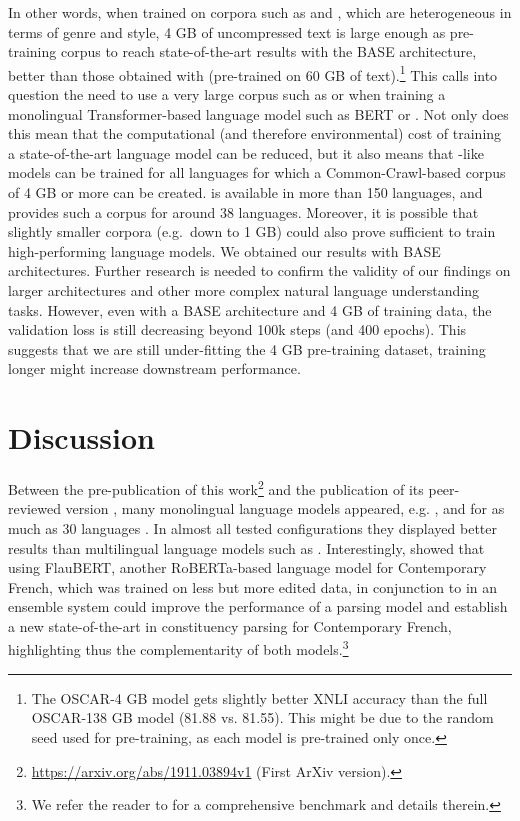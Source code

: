 In other words, when trained on corpora such as \oscar and \ccnet, which are heterogeneous in terms of genre and style, 4 GB of uncompressed text is large enough as pre-training corpus to reach state-of-the-art results with the BASE architecture, better than those obtained with \mbert (pre-trained on 60 GB of text).\footnote{The OSCAR-4 GB model gets slightly better XNLI accuracy than the full OSCAR-138 GB model (81.88 vs. 81.55). This might be due to the random seed used for pre-training, as each model is pre-trained only once.} This calls into question the need to use a very large corpus such as \oscar or \ccnet when training a monolingual Transformer-based language model such as BERT or \roberta. Not only does this mean that the computational (and therefore environmental) cost of training a state-of-the-art language model can be reduced, but it also means that \camembert-like models can be trained for all languages for which a Common-Crawl-based corpus of 4 GB or more can be created. \oscar is available in more than 150 languages, and provides such a corpus for around 38 languages. Moreover, it is possible that slightly smaller corpora (e.g.~down to 1 GB) could also prove sufficient to train high-performing language models. We obtained our results with BASE architectures. Further research is needed to confirm the validity of our findings on larger architectures and other more complex natural language understanding tasks. However, even with a BASE architecture and 4 GB of training data, the validation loss is still decreasing beyond 100k steps (and 400 epochs). This suggests that we are still under-fitting the 4 GB pre-training dataset, training longer might increase downstream performance.

\section{Discussion}

Between the pre-publication of this work\footnote{\url{https://arxiv.org/abs/1911.03894v1} (First ArXiv version).} and the publication of its peer-reviewed version \citep{martin-etal-2020-camembert}, many monolingual language models appeared, e.g. \citep{le-etal-2020-flaubert-unsupervised,virtanen-etal-2019-multilingual,delobelle-etal-2020-robbert}, and for as much as 30 languages \citep{nozza-etal-2020-what}. In almost all tested configurations they displayed better results than multilingual language models such as \mbert \citep{pires-etal-2019-multilingual}. Interestingly, \citet{le-etal-2020-flaubert-unsupervised} showed that using FlauBERT, another RoBERTa-based language model for Contemporary French, which was trained on less but more edited data, in conjunction to \camembert in an ensemble system could improve the performance of a parsing model and establish a new state-of-the-art in constituency parsing for Contemporary French, highlighting thus the complementarity of both models.\footnote{We refer the reader to \citep{le-etal-2020-flaubert-unsupervised} for a comprehensive benchmark and details therein.}


